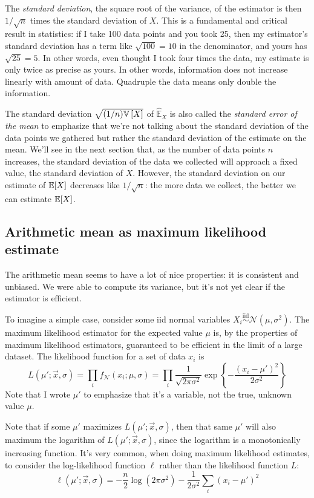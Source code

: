 The \emph{standard deviation}, the square root of the variance, of the
estimator is then $1 / \sqrt{n}$ times the standard deviation of $X$. This is
a fundamental and critical result in statistics: if I take 100 data points and
you took 25, then my estimator's standard deviation has a term like
$\sqrt{100} = 10$ in the denominator, and yours has $\sqrt{25} = 5$. In other
words, even thought I took four times the data, my estimate is only twice as
precise as yours. In other words, information does not increase linearly with
amount of data. Quadruple the data means only double the information.

The standard deviation $\sqrt{(1/n) \mathbb{V}\left[{X}\right]}$ of $\hat{\mathbb{E}}_X$ is also
called the \emph{standard error of the mean} to emphasize that we're not
talking about the standard deviation of the data points we gathered but rather
the standard deviation of the estimate on the mean. We'll see in the next
section that, as the number of data points $n$ increases, the standard
deviation of the data we collected will approach a fixed value, the standard
deviation of $X$. However, the standard deviation on our estimate of
$\mathbb{E}\!\left[{X}\right]$ decreases like $1/\sqrt{n}$: the more data we collect, the better
we can estimate $\mathbb{E}\!\left[{X}\right]$.

\subsection{Arithmetic mean as maximum likelihood estimate}

The arithmetic mean seems to have a lot of nice properties: it is consistent
and unbiased. We were able to compute its variance, but it's not yet clear if
the estimator is efficient.

To imagine a simple case, consider some iid normal variables $X_i
\stackrel{\text{iid}}{\sim} \mathcal{N}(\mu, \sigma^2)$. The maximum
likelihood estimator for the expected value $\mu$ is, by the properties of
maximum likelihood estimators, guaranteed to be efficient in the limit of a
large dataset. The likelihood function for a set of data $x_i$ is
\begin{equation}
  L(\mu'; \vec{x}, \sigma) = \prod_i f_{\mathcal{N}}(x_i; \mu, \sigma)
    = \prod_i \frac{1}{\sqrt{2 \pi \sigma^2}} \exp \left\{ - \frac{(x_i - \mu')^2}{2 \sigma^2} \right\}
\end{equation}
Note that I wrote $\mu'$ to emphasize that it's a variable, not the true,
unknown value $\mu$.

Note that if some $\mu'$ maximizes $L(\mu'; \vec{x}, \sigma)$, then that same
$\mu'$ will also maximum the logarithm of $L(\mu'; \vec{x}, \sigma)$, since the
logarithm is a monotonically increasing function. It's very common, when doing
maximum likelihood estimates, to consider the log-likelihood function $\ell$
rather than the likelihood function $L$:
\begin{equation}
\ell(\mu'; \vec{x}, \sigma) = -\frac{n}{2} \log \left(2 \pi \sigma^2 \right) - \frac{1}{2\sigma^2} \sum_i (x_i - \mu')^2
\end{equation}

